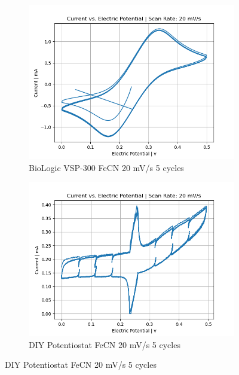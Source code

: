 \documentclass{article}
\begin{document}
\begin{figure}[H]
  \centering
  \begin{subfigure}[b]{0.45\textwidth}
    \includegraphics[width=\textwidth]{FECN_20mVs_5cycles_lab.png}
    \caption{BioLogic VSP-300 FeCN 20 mV/s 5 cycles}
  \end{subfigure}
  \hfill
  \begin{subfigure}[b]{0.45\textwidth}
    \includegraphics[width=\textwidth]{FECN_20mVs_5cycles.png}
    \caption{DIY Potentiostat FeCN 20 mV/s 5 cycles}
  \end{subfigure}


\end{figure}
\end{document}
